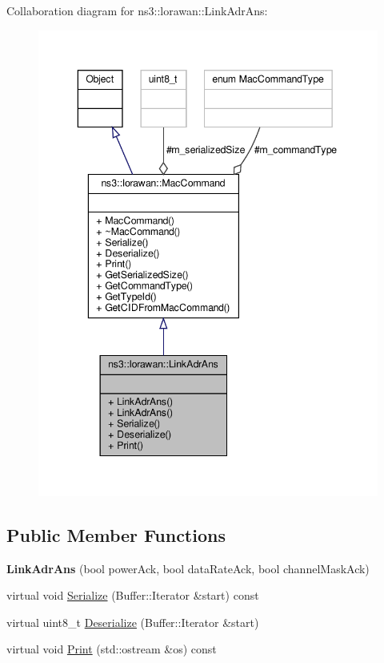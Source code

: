 Collaboration diagram for ns3\+:\+:lorawan\+:\+:Link\+Adr\+Ans\+:
\nopagebreak
\begin{figure}[H]
\begin{center}
\leavevmode
\includegraphics[width=343pt]{classns3_1_1lorawan_1_1LinkAdrAns__coll__graph}
\end{center}
\end{figure}
\subsection*{Public Member Functions}
\begin{DoxyCompactItemize}
\item 
\mbox{\label{classns3_1_1lorawan_1_1LinkAdrAns_a6837feca5c8a4bf06c2b86e6b3854749}} 
{\bfseries Link\+Adr\+Ans} (bool power\+Ack, bool data\+Rate\+Ack, bool channel\+Mask\+Ack)
\item 
virtual void \hyperlink{classns3_1_1lorawan_1_1LinkAdrAns_a057b6fc123d090cdd835c90760a883ca}{Serialize} (Buffer\+::\+Iterator \&start) const
\item 
virtual uint8\+\_\+t \hyperlink{classns3_1_1lorawan_1_1LinkAdrAns_a2d90637751496615710c55233a3480a6}{Deserialize} (Buffer\+::\+Iterator \&start)
\item 
virtual void \hyperlink{classns3_1_1lorawan_1_1LinkAdrAns_a91434c73f73c48f60c1fa2226278ca99}{Print} (std\+::ostream \&os) const
\end{DoxyCompactItemize}
